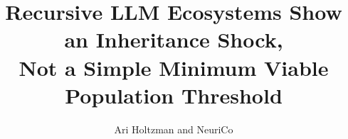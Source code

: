 \documentclass{article}
\title{Recursive LLM Ecosystems Show an Inheritance Shock,\\Not a Simple Minimum Viable Population Threshold}
\author{Ari Holtzman and NeuriCo}
\begin{document}
\maketitle

\begin{abstract}

\end{abstract}









\end{document}
